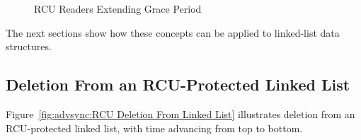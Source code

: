 \begin{figure}[htb]
\begin{center}
\end{center}
\caption{RCU Readers Extending Grace Period}
\label{fig:advsync:RCU Readers Extending Grace Periods}
\end{figure}

The next sections show how these concepts can be applied to linked-list
data structures.

\subsection{Deletion From an RCU-Protected Linked List}
\label{sec:advsync:Deletion From an RCU-Protected Linked List}

Figure~\ref{fig:advsync:RCU Deletion From Linked List}
illustrates deletion from an RCU-protected linked list,
with time advancing from top to bottom.

